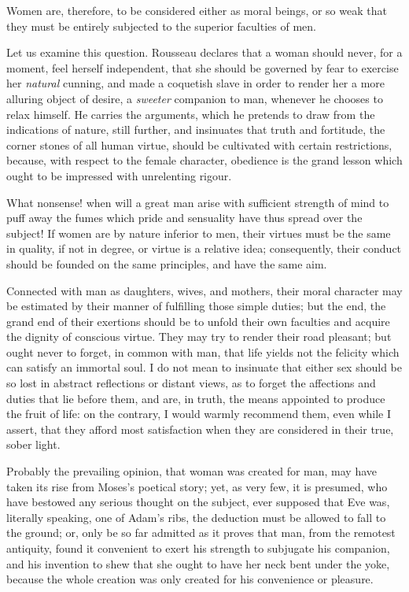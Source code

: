 Women are, therefore, to be considered either as moral beings, or so
weak that they must be entirely subjected to the superior faculties of
men.

Let us examine this question. Rousseau declares that a woman should
never, for a moment, feel herself independent, that she should be
governed by fear to exercise her \textit{natural} cunning, and made a
coquetish slave in order to render her a more alluring object of
desire, a \textit{sweeter} companion to man, whenever he chooses to
relax himself. He carries the arguments, which he pretends to draw
from the indications of nature, still further, and insinuates that
truth and fortitude, the corner stones of all human virtue, should be
cultivated with certain restrictions, because, with respect to the
female character, obedience is the grand lesson which ought to be
impressed with unrelenting rigour.


What nonsense! when will a great man arise with sufficient strength of
mind to puff  away the fumes which pride and sensuality have
thus spread over the subject! If women are by nature inferior to men,
their virtues must be the same in quality, if not in degree, or
virtue is a relative idea; consequently, their conduct should be
founded on the same principles, and have the same aim.

Connected with man as daughters, wives, and mothers, their moral
character may be estimated by their manner of fulfilling those simple
duties; but the end, the grand end of their exertions should be to
unfold their own faculties and acquire the dignity of conscious
virtue. They may try to render their road pleasant; but ought never to
forget, in common with man, that life yields not the felicity which
can satisfy an immortal soul. I do not mean to insinuate that either
sex should be so lost in abstract reflections or distant views, as to
forget the affections and duties that lie before them, and are, in
truth, the means appointed to produce the fruit of life: on the
contrary, I would warmly recommend them, even while I assert, that
they afford most satisfaction when they are considered in their true,
sober light.

Probably the prevailing opinion, that woman was created for man, may
have taken  its rise from Moses's poetical story; yet, as
very few, it is presumed, who have bestowed any serious thought on the
subject, ever supposed that Eve was, literally speaking, one of Adam's
ribs, the deduction must be allowed to fall to the ground; or, only be
so far admitted as it proves that man, from the remotest antiquity,
found it convenient to exert his strength to subjugate his companion,
and his invention to shew that she ought to have her neck bent under
the yoke, because the whole creation was only created for his
convenience or pleasure.

